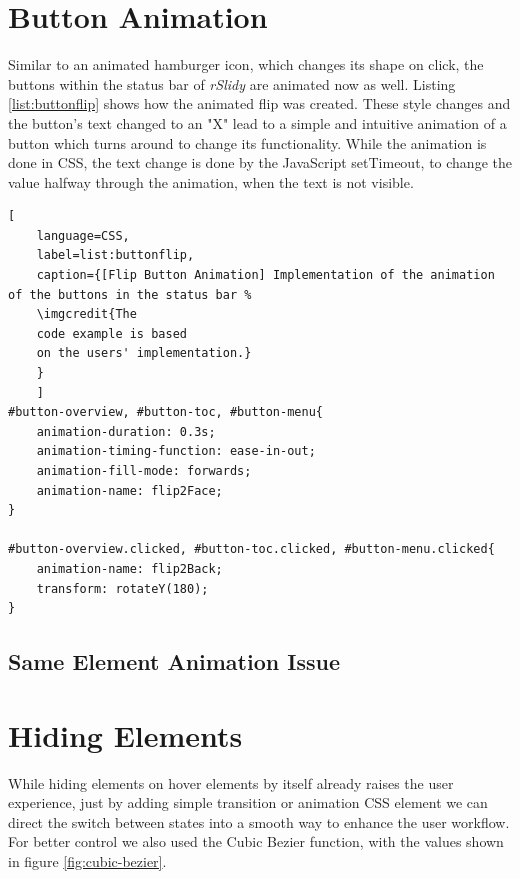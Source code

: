 
\section{Button Animation} %
\label{sec:button_animation}

Similar to an animated hamburger icon, which changes its shape on click, the buttons within the status bar of \textit{rSlidy} are animated now as well. Listing \ref{list:buttonflip} shows how the animated flip was created. These style changes and the button's text changed to an "X" lead to a simple and intuitive animation of a button which turns around to change its functionality. While the animation is done in CSS, the text change is done by the JavaScript setTimeout, to change the value halfway through the animation, when the text is not visible.
\begin{minipage}{\linewidth}
	\begin{lstlisting}[
	language=CSS,
	label=list:buttonflip,
	caption={[Flip Button Animation] Implementation of the animation of the buttons in the status bar %
	\imgcredit{The 
	code example is based 
	on the users' implementation.}
	}
	]
#button-overview, #button-toc, #button-menu{ 
	animation-duration: 0.3s; 
	animation-timing-function: ease-in-out;
	animation-fill-mode: forwards;
	animation-name: flip2Face;
}

#button-overview.clicked, #button-toc.clicked, #button-menu.clicked{
	animation-name: flip2Back; 
	transform: rotateY(180);
}
	\end{lstlisting}
\end{minipage}

\subsection{Same Element Animation Issue} %
\label{sub:same_element_animation_issue}



\section{Hiding Elements} %
\label{sec:hiding_elements}

While hiding elements on hover elements by itself already raises the user experience, just by adding simple transition or animation CSS element we can direct the switch between states into a smooth way to enhance the user workflow. For better control we also used the Cubic Bezier function, with the values shown in figure \ref{fig:cubic-bezier}.

